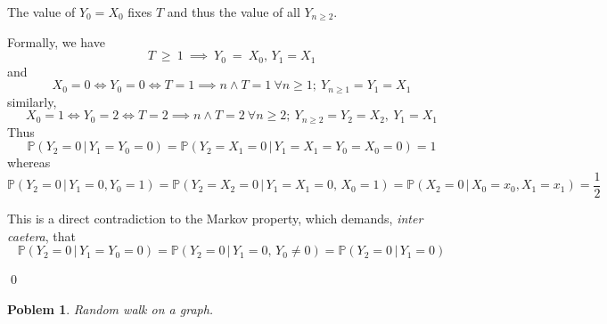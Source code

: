 \documentclass[8pt,notitlepage]{report}
\newtheorem{problem}{Poblem}
\newenvironment{solution}[1][Solution]{\begin{trivlist}
    \item[\hskip \labelsep {\bfseries #1}]}{\end{trivlist}}
\newcommand{\PP}{\mathbb{P}}
\begin{document}
\begin{solution}

The value of $Y_0 = X_0$ fixes $T$ and thus the value of all $Y_{n \geq 2}$.


Formally, we have
$$
 T~\ge~1~\implies~Y_0~=~X_0,\, Y_1 = X_1
$$
and 
\small
$$
 X_0 = 0 \iff Y_0 = 0 \iff T=1 \implies n \wedge T = 1 \  \forall n \geq 1 ;\   Y_{n\geq 1} = Y_1 = X_1
$$
\normalsize
similarly,
\small
$$
 X_0 = 1 \iff Y_0 = 2 \iff T=2 \implies n \wedge T = 2 \  \forall n \geq 2 ;\  Y_{n\geq 2} = Y_2 = X_2,\ Y_1 = X_1
$$
\normalsize
Thus
$$
\PP(Y_2=0\,|\,Y_1=Y_0=0) = \PP(Y_2=X_1=0\,|\,Y_1=X_1=Y_0=X_0=0) = 1
$$
whereas
\small
$$
\PP(Y_2=0\,|\,Y_1=0,Y_0=1) = \PP(Y_2=X_2=0\,|\,Y_1=X_1=0,\,X_0=1) = \PP(X_2=0\,|\,X_0=x_0,X_1=x_1) = \frac{1}{2}
$$
\normalsize

This is a direct contradiction to the Markov property, which demands, {\it inter caetera}, that
$$
 \PP(Y_2=0\, |\, Y_1=Y_0=0 ) = \PP(Y_2=0\,|\, Y_1=0,\,Y_0\neq0) = \PP(Y_2=0\,|\,Y_1=0)
$$

\qed
\end{solution}


\begin{problem} Random walk on a graph.

\end{problem}
\end{document}

